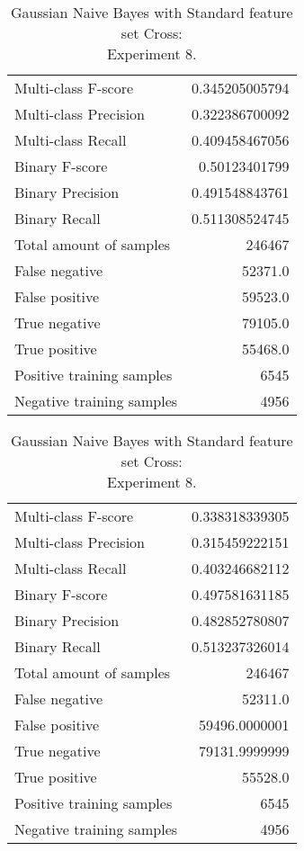\begin{table}[H]
\begin{minipage}{0.5\textwidth}
\caption{Gaussian Naive Bayes with Standard feature set Cross: \\Experiment 7.}
\centering
\begin{tabular}{l r}
\toprule
Multi-class F-score & 0.345205005794 \\
Multi-class Precision & 0.322386700092 \\
Multi-class Recall & 0.409458467056 \\
\midrule
Binary F-score & 0.50123401799 \\
Binary Precision & 0.491548843761 \\
Binary Recall & 0.511308524745 \\
\midrule
Total amount of samples & 246467 \\
False negative & 52371.0 \\
False positive & 59523.0 \\
True negative & 79105.0 \\
True positive & 55468.0 \\
\midrule
Positive training samples & 6545 \\
Negative training samples & 4956 \\
\bottomrule
\end{tabular}
\end{minipage}
\hfillx
\begin{minipage}{0.5\textwidth}
\caption{Gaussian Naive Bayes with Standard feature set Cross: \\Experiment 8.}
\centering
\begin{tabular}{l r}
\toprule
Multi-class F-score & 0.338318339305 \\
Multi-class Precision & 0.315459222151 \\
Multi-class Recall & 0.403246682112 \\
\midrule
Binary F-score & 0.497581631185 \\
Binary Precision & 0.482852780807 \\
Binary Recall & 0.513237326014 \\
\midrule
Total amount of samples & 246467 \\
False negative & 52311.0 \\
False positive & 59496.0000001 \\
True negative & 79131.9999999 \\
True positive & 55528.0 \\
\midrule
Positive training samples & 6545 \\
Negative training samples & 4956 \\
\bottomrule
\end{tabular}
\end{minipage}
\end{table}
